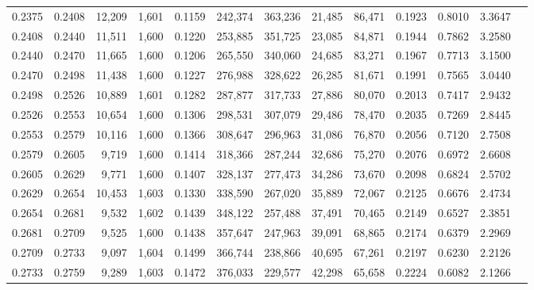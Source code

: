 \begin{tabular}{rrrrrrrrrrrrr}
0.2375 & 0.2408 & 12,209 & 1,601 &                                     0.1159 & 242,374 & 363,236 &  21,485 &  86,471 & 0.1923 & 0.8010 & 3.3647 \\
0.2408 & 0.2440 & 11,511 & 1,600 &                                     0.1220 & 253,885 & 351,725 &  23,085 &  84,871 & 0.1944 & 0.7862 & 3.2580 \\
0.2440 & 0.2470 & 11,665 & 1,600 &                                     0.1206 & 265,550 & 340,060 &  24,685 &  83,271 & 0.1967 & 0.7713 & 3.1500 \\
0.2470 & 0.2498 & 11,438 & 1,600 &                                     0.1227 & 276,988 & 328,622 &  26,285 &  81,671 & 0.1991 & 0.7565 & 3.0440 \\
0.2498 & 0.2526 & 10,889 & 1,601 &                                     0.1282 & 287,877 & 317,733 &  27,886 &  80,070 & 0.2013 & 0.7417 & 2.9432 \\
0.2526 & 0.2553 & 10,654 & 1,600 &                                     0.1306 & 298,531 & 307,079 &  29,486 &  78,470 & 0.2035 & 0.7269 & 2.8445 \\
0.2553 & 0.2579 & 10,116 & 1,600 &                                     0.1366 & 308,647 & 296,963 &  31,086 &  76,870 & 0.2056 & 0.7120 & 2.7508 \\
0.2579 & 0.2605 &  9,719 & 1,600 &                                     0.1414 & 318,366 & 287,244 &  32,686 &  75,270 & 0.2076 & 0.6972 & 2.6608 \\
0.2605 & 0.2629 &  9,771 & 1,600 &                                     0.1407 & 328,137 & 277,473 &  34,286 &  73,670 & 0.2098 & 0.6824 & 2.5702 \\
0.2629 & 0.2654 & 10,453 & 1,603 &                                     0.1330 & 338,590 & 267,020 &  35,889 &  72,067 & 0.2125 & 0.6676 & 2.4734 \\
0.2654 & 0.2681 &  9,532 & 1,602 &                                     0.1439 & 348,122 & 257,488 &  37,491 &  70,465 & 0.2149 & 0.6527 & 2.3851 \\
0.2681 & 0.2709 &  9,525 & 1,600 &                                     0.1438 & 357,647 & 247,963 &  39,091 &  68,865 & 0.2174 & 0.6379 & 2.2969 \\
0.2709 & 0.2733 &  9,097 & 1,604 &                                     0.1499 & 366,744 & 238,866 &  40,695 &  67,261 & 0.2197 & 0.6230 & 2.2126 \\
0.2733 & 0.2759 &  9,289 & 1,603 &                                     0.1472 & 376,033 & 229,577 &  42,298 &  65,658 & 0.2224 & 0.6082 & 2.1266 \\

\end{tabular}
